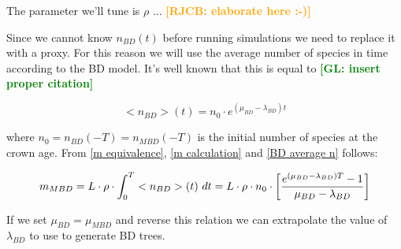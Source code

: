\documentclass{article}
\newcommand*\richel[1]{\textcolor{orange}{\textbf{[RJCB: #1]}}}
\newcommand*\gio[1]{\textcolor{green}{\textbf{[GL: #1]}}}
\begin{document}
\begin{itemize}
The parameter we'll tune is $\rho$ ... \richel{elaborate here :-)}

Since we cannot know $n_{BD}(t)$ before running simulations
we need to replace it with a proxy. 
For this reason we will use the average number of
species in time according to the BD model. 
It's well known that this is equal to \gio{insert proper citation}

\begin{equation}
    <n_{BD}>(t) = n_{0} \cdot e^{(\mu_{BD} - \lambda_{BD})t} \label{BD average n}
\end{equation}

where $n_{0} = n_{BD}(-T) = n_{MBD}(-T)$ is the initial number of species 
at the crown age.
From \ref{m equivalence}, \ref{m calculation} and \ref{BD average n} follows:

\begin{equation}
m_{MBD} = L \cdot \rho \cdot \int_{0}^{T} <n_{BD}>(t)\ dt \\
= L \cdot \rho \cdot n_{0} \cdot \left[ \frac{e^{(\mu_{BD} - \lambda_{BD})T} - 1}{\mu_{BD} - \lambda_{BD}} \right]
\end{equation}

If we set $\mu_{BD} = \mu_{MBD}$ and reverse this relation 
we can extrapolate the value of $\lambda_{BD}$ to use to generate BD trees.


\end{itemize}
\end{document}
